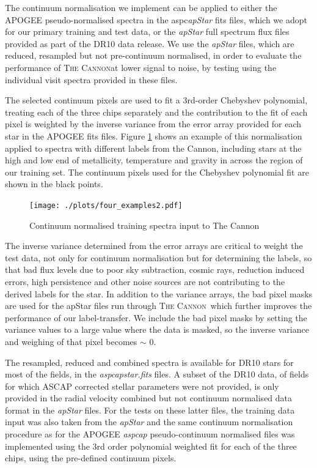 \documentclass[12pt, preprint]{aastex}
\newcommand{\tc}{\textsc{The Cannon}}
\begin{document}
The continuum normalisation we implement can be applied to either the APOGEE pseudo-normalised spectra in the aspc\textit{apStar} fits files, which we adopt for our primary training and test data, or the \textit{apStar} full spectrum flux files provided as part of the DR10 data release. We use the \textit{apStar} files, which are reduced, resampled but not pre-continuum normalised, in order to evaluate the performance of \tc at lower signal to noise, by testing using the individual visit spectra provided in these files.  

The selected continuum pixels are used to fit a 3rd-order Chebyshev polynomial, treating each of the three chips separately and the contribution to the fit of each pixel is weighted by the inverse variance from the error array provided for each star in the APOGEE fits files. Figure \ref{fig:norm} shows an example of this normalisation applied to spectra with different labels from the Cannon, including stars at the high and low end of metallicity, temperature and gravity in across the region of our training set. The continuum pixels used for the Chebyshev polynomial fit are shown in the black points. 

%
\begin{figure}[h!]
  \texttt{[image: ./plots/four\_examples2.pdf]}
\caption{Continuum normalised training spectra input to The Cannon}
\label{fig:norm}
\end{figure}


The inverse variance determined from the error arrays are critical to weight the test data, not only for continuum normalisation but for determining the labels, so that bad flux levels due to poor sky subtraction, cosmic rays, reduction induced errors, high persistence and other noise sources are not contributing to the derived labels for the star. In addition to the variance arrays, the bad pixel masks are used for the apStar files run through \tc\, which further improves the performance of our label-transfer. We include the bad pixel masks by setting the variance values to a large value where the data is masked, so the inverse variance and weighing of that pixel becomes $\sim$ 0. 

The resampled, reduced and combined spectra is available for DR10 stars for most of the fields, in the \textit{aspcapstar.fits} files. A subset of the DR10 data, of fields for which ASCAP corrected stellar parameters were not provided, is only provided in the radial velocity combined but not continuum normalised data format in the \textit{apStar} files. For the tests on these latter files, the training data input was also taken from the \textit{apStar} and the same continuum normalisation procedure as for the APOGEE \textit{aspcap} pseudo-continuum normalised files was implemented using the 3rd order polynomial weighted fit for each of the three chips, using the pre-defined continuum pixels.
\end{document}
